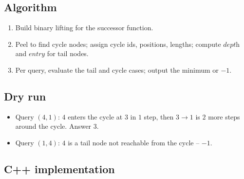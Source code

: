 \subsection*{Algorithm}

\begin{enumerate}
  \item Build binary lifting for the successor function.
  \item Peel to find cycle nodes; assign cycle ids, positions, lengths;
        compute $\textit{depth}$ and $\textit{entry}$ for tail nodes.
  \item Per query, evaluate the tail and cycle cases; output the minimum or
        $-1$.
\end{enumerate}

\subsection*{Dry run}


\begin{itemize}
  \item Query $(4,1)$: $4$ enters the cycle at $3$ in $1$ step, then $3\to
        1$ is $2$ more steps around the cycle. Answer $3$.
  \item Query $(1,4)$: $4$ is a tail node not reachable from the cycle --
        $-1$.
\end{itemize}

\subsection*{C++ implementation}

